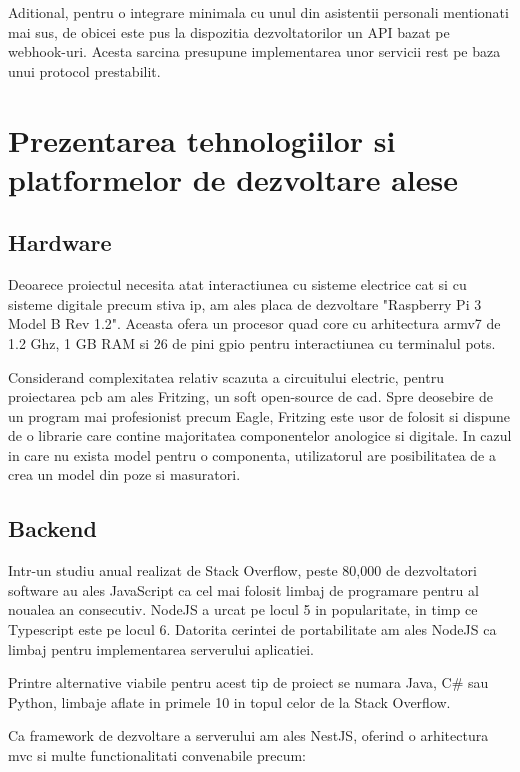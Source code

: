 Aditional, pentru o integrare minimala cu unul din asistentii personali mentionati mai sus, de obicei este pus la dispozitia dezvoltatorilor un API bazat pe webhook-uri. Acesta sarcina presupune implementarea unor servicii \acrshort{rest} pe baza unui protocol prestabilit. 

\section {Prezentarea tehnologiilor si platformelor de dezvoltare alese}

\subsection {Hardware}

Deoarece proiectul necesita atat interactiunea cu sisteme electrice cat si cu sisteme digitale precum stiva \acrshort{ip}, am ales placa de dezvoltare "Raspberry Pi 3 Model B Rev 1.2". Aceasta ofera un procesor quad core cu arhitectura armv7 de 1.2 Ghz, 1 GB RAM si 26 de pini \acrfull{gpio} pentru interactiunea cu terminalul \acrshort{pots}.

Considerand complexitatea relativ scazuta a circuitului electric, pentru proiectarea \acrshort{pcb} am ales Fritzing, un soft open-source de \acrfull{cad}. Spre deosebire de un program mai profesionist precum Eagle, Fritzing este usor de folosit si dispune de o librarie care contine majoritatea componentelor anologice si digitale. In cazul in care nu exista model pentru o componenta, utilizatorul are posibilitatea de a crea un model din poze si masuratori. 

\subsection {Backend}

Intr-un studiu anual realizat de Stack Overflow, peste 80,000 de dezvoltatori software au ales JavaScript ca cel mai folosit limbaj de programare pentru al noualea an consecutiv. NodeJS a urcat pe locul 5 in popularitate, in timp ce Typescript este pe locul 6. Datorita cerintei de portabilitate am ales NodeJS ca limbaj pentru implementarea serverului aplicatiei. \cite{StackOverflow2021Survey}

Printre alternative viabile pentru acest tip de proiect se numara Java, C\# sau Python, limbaje aflate in primele 10 in topul celor de la Stack Overflow.

Ca framework de dezvoltare a serverului am ales NestJS, oferind o arhitectura \acrfull{mvc} si multe functionalitati convenabile precum:

